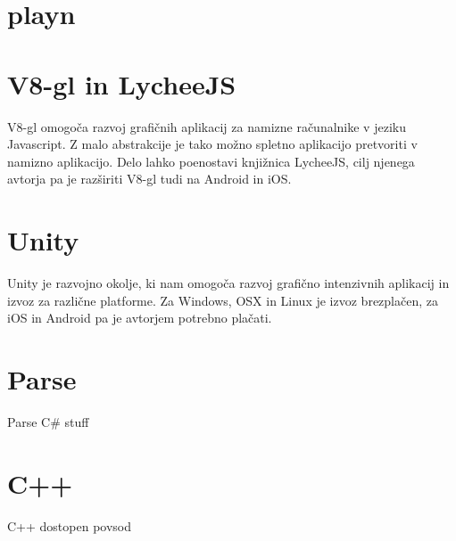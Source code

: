 \section{playn\cite{playn}}

\section{V8-gl\cite{v8gl} in LycheeJS\cite{lycheejs}}

V8-gl omogoča razvoj grafičnih aplikacij za namizne računalnike v jeziku Javascript. Z malo abstrakcije je tako možno spletno aplikacijo pretvoriti v namizno aplikacijo. Delo lahko poenostavi knjižnica LycheeJS, cilj njenega avtorja pa je razširiti V8-gl tudi na Android in iOS.

\section{Unity\cite{unity}}

Unity je razvojno okolje, ki nam omogoča razvoj grafično intenzivnih aplikacij in izvoz za različne platforme. Za Windows, OSX in Linux je izvoz brezplačen, za iOS in Android pa je avtorjem potrebno plačati.

\section{Parse\cite{parse}}

Parse C\# stuff

\section{C++}

C++ dostopen povsod

